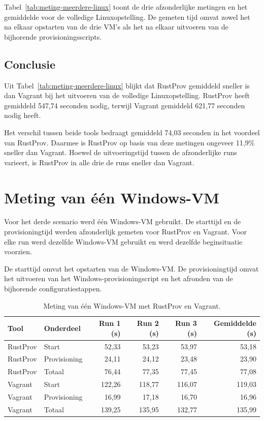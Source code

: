 Tabel~\ref{tab:meting-meerdere-linux} toont de drie afzonderlijke metingen en
het gemiddelde voor de volledige Linuxopstelling. De gemeten tijd omvat zowel
het na elkaar opstarten van de drie VM's als het na elkaar uitvoeren van de
bijhorende provisioningsscripts.

\subsection{Conclusie}

Uit Tabel~\ref{tab:meting-meerdere-linux} blijkt dat RustProv gemiddeld sneller
is dan Vagrant bij het uitvoeren van de volledige Linuxopstelling. RustProv
heeft gemiddeld 547,74 seconden nodig, terwijl Vagrant gemiddeld 621,77
seconden nodig heeft.

Het verschil tussen beide tools bedraagt gemiddeld 74,03 seconden in het
voordeel van RustProv. Daarmee is RustProv op basis van deze metingen ongeveer
11,9\% sneller dan Vagrant. Hoewel de uitvoeringstijd tussen de afzonderlijke
runs varieert, is RustProv in alle drie de runs sneller dan Vagrant.

\section{Meting van één Windows-VM}

Voor het derde scenario werd één Windows-VM gebruikt. De starttijd en de
provisioningtijd werden afzonderlijk gemeten voor RustProv en Vagrant. Voor elke
run werd dezelfde Windows-VM gebruikt en werd dezelfde beginsituatie voorzien.

De starttijd omvat het opstarten van de Windows-VM. De provisioningtijd omvat het
uitvoeren van het Windows-provisioningscript en het afronden van de bijhorende
configuratiestappen.

\begin{table}[htbp]
    \centering
    \caption{Meting van één Windows-VM met RustProv en Vagrant.}
    \label{tab:meting-een-windows}
    \begin{tabular}{llrrrr}
        \toprule
        \textbf{Tool} &
        \textbf{Onderdeel} &
        \textbf{Run 1 (s)} &
        \textbf{Run 2 (s)} &
        \textbf{Run 3 (s)} &
        \textbf{Gemiddelde (s)} \\
        \midrule
        RustProv & Start & 52,33 & 53,23 & 53,97 & 53,18 \\
        RustProv & Provisioning & 24,11 & 24,12 & 23,48 & 23,90 \\
        RustProv & Totaal & 76,44 & 77,35 & 77,45 & 77,08 \\
        Vagrant  & Start & 122,26 & 118,77 & 116,07 & 119,03 \\
        Vagrant  & Provisioning & 16,99 & 17,18 & 16,70 & 16,96 \\
        Vagrant  & Totaal & 139,25 & 135,95 & 132,77 & 135,99 \\
        \bottomrule
    \end{tabular}
\end{table}

